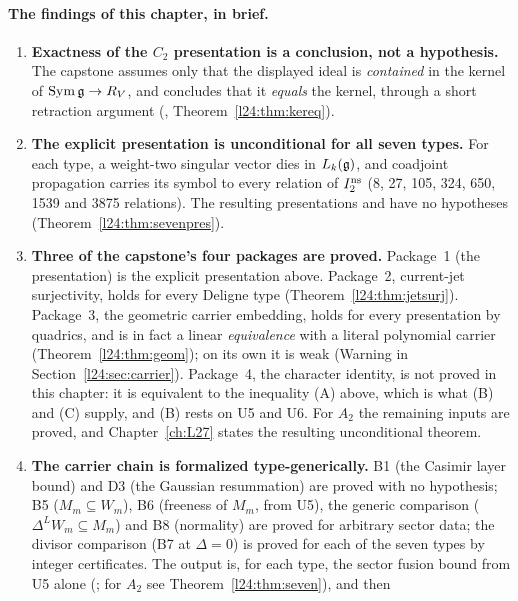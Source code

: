 \paragraph{The findings of this chapter, in brief.}
\begin{enumerate}
\item \textbf{Exactness of the $C_2$ presentation is a conclusion, not a hypothesis.} The capstone
   assumes only that the displayed ideal is
  \emph{contained} in the kernel of $\operatorname{Sym}\mathfrak g\to R_V$, and concludes that it
  \emph{equals} the kernel, through a short retraction argument
  (, Theorem~\ref{l24:thm:kereq}).
\item \textbf{The explicit presentation is unconditional for all seven types.} For each type, a
  weight-two singular vector dies in $L_k(\mathfrak g)$, and coadjoint propagation carries its
  symbol to every relation of $I_2^{\mathrm{ns}}$ (8, 27, 105, 324, 650, 1539 and 3875 relations). The
  resulting presentations  and  have no hypotheses
  (Theorem~\ref{l24:thm:sevenpres}).
\item \textbf{Three of the capstone's four packages are proved.} Package~1 (the presentation) is the explicit
  presentation above. Package~2, current-jet surjectivity, holds for every Deligne type
  (Theorem~\ref{l24:thm:jetsurj}). Package~3, the geometric carrier embedding, holds for every presentation by
  quadrics, and is in fact a linear \emph{equivalence} with a literal polynomial carrier
  (Theorem~\ref{l24:thm:geom}); on its own it is weak (Warning in Section~\ref{l24:sec:carrier}). Package~4, the
  character identity, is not proved in this chapter: it is equivalent to the inequality (A) above, which is what (B)
  and (C) supply, and (B) rests on U5 and U6. For $A_2$ the remaining inputs are proved, and Chapter~\ref{ch:L27} states
  the resulting unconditional theorem.
\item \textbf{The carrier chain is formalized type-generically.} B1 (the Casimir layer bound) and D3
  (the Gaussian resummation) are proved with no hypothesis; B5 ($M_m\subseteq W_m$), B6 (freeness of
  $M_m$, from U5), the generic comparison ($\Delta^L W_m\subseteq M_m$) and B8 (normality) are proved
  for arbitrary sector data; the divisor comparison (B7 at $\Delta=0$) is proved for each of the seven
  types by integer certificates. The output is, for each type, the sector fusion bound from U5 alone
  (; for $A_2$ see Theorem~\ref{l24:thm:seven}), and then

\end{enumerate}
